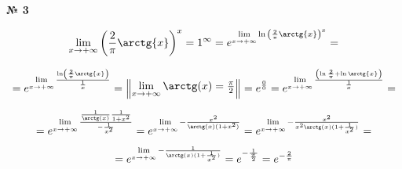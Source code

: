 \documentclass{article}
\begin{document}
\textbf{№ 3} 

\begingroup
\Large

$$ \lim_{x\to +\infty} \left( \frac{2}{\pi} \arctg{x} \right)^{x}
= 1^{\infty} 
= e^{\lim\limits_{x\to +\infty} \ln{\left( \frac{2}{\pi} \arctg{x} \right)^{x}}}
= $$

$$ = e^{\lim\limits_{x\to +\infty} \frac{ \ln \left({\frac{2}{\pi}}\arctg{x} \right)}{\frac{1}{x}}}
=  
\begin{Vmatrix}
\lim\limits_{x\to +\infty} \arctg(x) = \frac{\pi}{2}
\end{Vmatrix}
= e^{\frac{0}{0}}
= e^{\lim\limits_{x\to +\infty} \frac{\left( \ln{\frac{2}{\pi}} + \ln{\arctg{x}} \right)}{\frac{1}{x}}} 
= $$

$$ = e^{\lim\limits_{x\to +\infty} \frac{\frac{1}{\arctg(x)} \frac{1}{1+x^2}}{-\frac{1}{x^2}}}
= e^{\lim\limits_{x\to +\infty} -\frac{x^2}{\arctg(x)(1+x^2)}}
= e^{\lim\limits_{x\to +\infty} -\frac{x^2}{x^2 \arctg(x)(1+\frac{1}{x^2})}}
= $$

$$ = e^{\lim\limits_{x\to +\infty} -\frac{1}{\arctg(x)(1+\frac{1}{x^2})}} 
= e^{-\frac{1}{\frac{\pi}{2}}}
= e^{-\frac{2}{\pi}} $$

\endgroup
\end{document}

